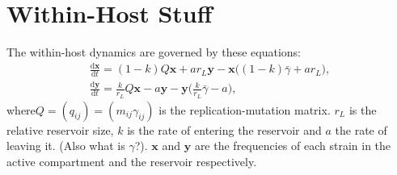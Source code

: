 \documentclass[DIV=15]{scrartcl}
\begin{document}
\section*{Within-Host Stuff}

The within-host dynamics are governed by these equations:
\begin{gather*}
\frac{\text{d} \bm{x}}{ \text{d} t} = (1-k)Q \bm{x} + ar_L \bm{y}-\bm{x} \big((1-k)\bar{\gamma} + a r_L \big), \\
\frac{\text{d} \bm{y}}{ \text{d} t} = \frac{k}{r_L}Q \bm{x} - a \bm{y}-\bm{y} \bigg(\frac{k}{r_L}\bar{\gamma} - a \bigg),
\end{gather*}
where$Q=( q_{ij}) = (m_{ij}\gamma_{ij})$ is the replication-mutation matrix.  $r_L$ is the relative reservoir size, 
$k$ is the rate of entering the reservoir and $a$ the  rate of leaving it. (Also what is $\gamma$?). $\bm{x}$ and $\bm{y}$ are the frequencies of each strain in the active compartment and the reservoir respectively.
\end{document}
